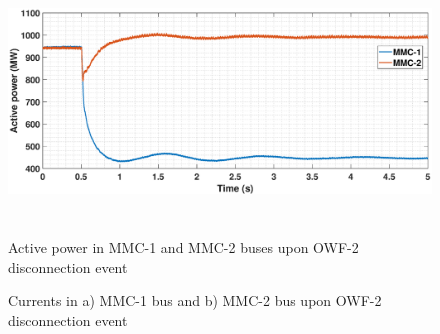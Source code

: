 \begin{figure}[H]
    \includegraphics[height = 7cm,width = \textwidth]{Diagrams/Chapter_5/P_MMC_1_2_WT2off.eps}
    \caption{Active power in MMC-1 and MMC-2 buses upon OWF-2 disconnection event}
    \label{P_MMC_1_2_WT2off}
\end{figure}

\begin{figure}[H]


\caption{Currents in a) MMC-1 bus and b) MMC-2 bus upon OWF-2 disconnection event}
\label{fig:IABC_MMC_1_2_WT2off}
\end{figure}


